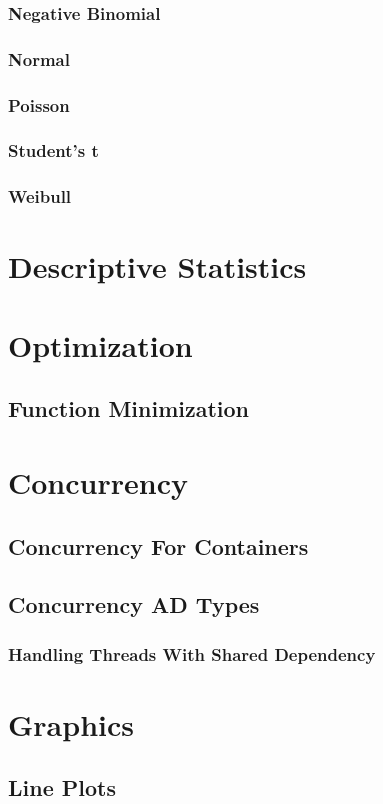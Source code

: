 \documentclass[12pt,a4paper]{article}
\begin{document}
\subsubsection{Negative Binomial}
\subsubsection{Normal}
\subsubsection{Poisson}
\subsubsection{Student's t}
\subsubsection{Weibull}
\section{Descriptive Statistics}
\section{Optimization}
\subsection{Function Minimization}
\section{Concurrency}
\subsection{Concurrency For Containers}
\subsection{Concurrency AD Types}
\subsubsection{Handling Threads With Shared Dependency}
\section{Graphics}
\subsection{Line Plots}
\end{document}
